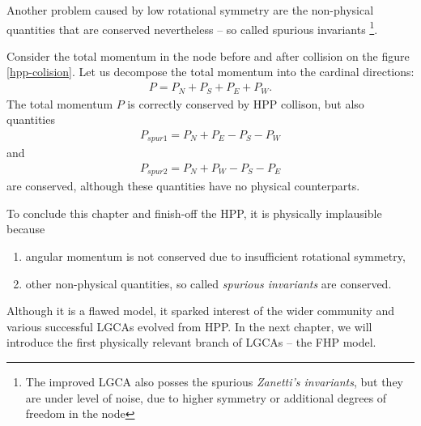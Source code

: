 \bigskip
Another problem caused by low rotational symmetry are the non-physical quantities that are conserved nevertheless -- so called spurious invariants \footnote{The improved LGCA also posses the spurious \textit{Zanetti's invariants}, but they are under level of noise, due to higher symmetry or additional degrees of freedom in the node}.

Consider the total momentum in the node before and after collision on the figure \ref{hpp-colision}.
Let us decompose the total momentum into the cardinal directions:
\begin{align} 
P = P_N + P_S + P_E + P_W.
\end{align}
The total momentum $P$ is correctly conserved by HPP collison, but also quantities
\begin{align} \label{zanet}
P_{spur1} = P_N + P_E - P_S - P_W
\end{align}
and
\begin{align}
P_{spur2} = P_N + P_W - P_S - P_E
\end{align}
are conserved, although these quantities have no physical counterparts.

\bigskip

To conclude this chapter and finish-off the HPP, it is physically implausible because
\begin{enumerate}
\item angular momentum is not conserved due to insufficient rotational symmetry,
\item other non-physical quantities, so called \textit{spurious invariants} are conserved.
\end{enumerate}

Although it is a flawed model, it sparked interest of the wider community and various successful LGCAs evolved from HPP. In the next chapter, we will introduce the first physically relevant branch of LGCAs -- the FHP model.